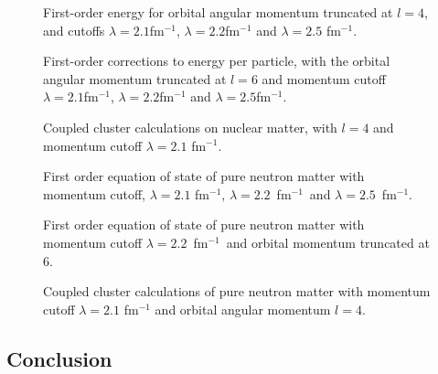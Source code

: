 \begin{figure}[htpb]
		
		\caption{First-order energy for orbital angular momentum truncated at $l=4$, 
and cutoffs  $\lambda=2.1$fm$^{-1}$, $\lambda=2.2$fm$^{-1}$ and $\lambda=2.5$ fm$^{-1}$.}
		\label{fig:hf21}
\end{figure}
%		
\begin{figure}[htpb]
		
		\caption{First-order corrections to energy per particle, with the orbital angular momentum truncated at $l=6$ and momentum cutoff $\lambda=2.1$fm$^{-1}$, $\lambda=2.2$fm$^{-1}$ and $\lambda=2.5$fm$^{-1}$.}
		\label{fig:hf23}
\end{figure}
\begin{figure}

\caption{Coupled cluster calculations on nuclear matter, with $l=4$ and momentum cutoff $\lambda=2.1$ fm$^{-1}$.}
\label{fig:ccm_nucl_4_21}
\end{figure}
\begin{figure}

\caption{First order equation of state of pure neutron matter with momentum cutoff, $\lambda=2.1$ fm$^{-1}$, $\lambda=2.2$~fm$^{-1}$~and $\lambda=2.5$~fm$^{-1}$.}
\label{fig:first_neutron_l4}
\end{figure}
\begin{figure}

\caption{First order equation of state of pure neutron matter with momentum cutoff $\lambda=2.2$~fm$^{-1}$~and orbital momentum truncated at 6.}
\label{fig:first_neutron_l6}
\end{figure}
%
\begin{figure}

\caption{Coupled cluster calculations of pure neutron matter with momentum cutoff $\lambda=2.1$ fm$^{-1}$ and orbital angular momentum $l=4$.}
\label{fig:ccm_net_4_21}
\end{figure}



\subsection{Conclusion}

